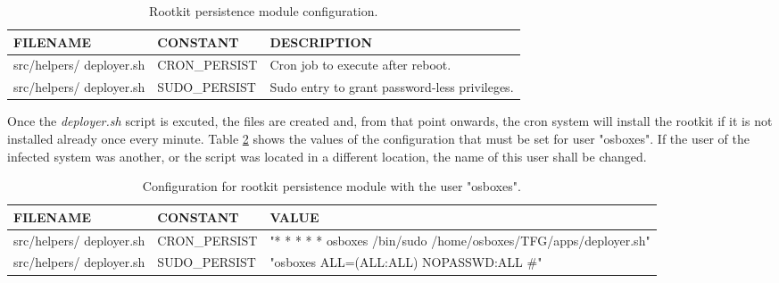 \begin{table}[htbp]
\begin{tabular}{|>{\centering\arraybackslash}p{3cm}|>{\centering\arraybackslash}p{4.5cm}|>{\centering\arraybackslash}p{6cm}|}
\hline
\textbf{FILENAME} & \textbf{CONSTANT} & \textbf{DESCRIPTION}\\
\hline
\hline
src/helpers/ deployer.sh & CRON\_PERSIST & Cron job to execute after reboot.\\
\hline
src/helpers/ deployer.sh & SUDO\_PERSIST & Sudo entry to grant password-less privileges.\\
\hline
\end{tabular}
\caption{Rootkit persistence module configuration.}
\label{table:rootkit_persistence_config}
\end{table}

Once the \textit{deployer.sh} script is excuted, the files are created  and, from that point onwards, the cron system will install the rootkit if it is not installed already once every minute. Table \ref{table:rootkit_persistence_config_defaults} shows the values of the configuration that must be set for user "osboxes". If the user of the infected system was another, or the script was located in a different location, the name of this user shall be changed.

\begin{table}[htbp]
\begin{tabular}{|>{\centering\arraybackslash}p{3cm}|>{\centering\arraybackslash}p{4.5cm}|>{\centering\arraybackslash}p{6cm}|}
\hline
\textbf{FILENAME} & \textbf{CONSTANT} & \textbf{VALUE}\\
\hline
\hline
src/helpers/ deployer.sh & CRON\_PERSIST & "* * * * * osboxes /bin/sudo /home/osboxes/TFG/apps/deployer.sh"\\
\hline
src/helpers/ deployer.sh & SUDO\_PERSIST & "osboxes ALL=(ALL:ALL) NOPASSWD:ALL \#"\\
\hline
\end{tabular}
\caption{Configuration for rootkit persistence module with the user "osboxes".}
\label{table:rootkit_persistence_config_defaults}
\end{table}



